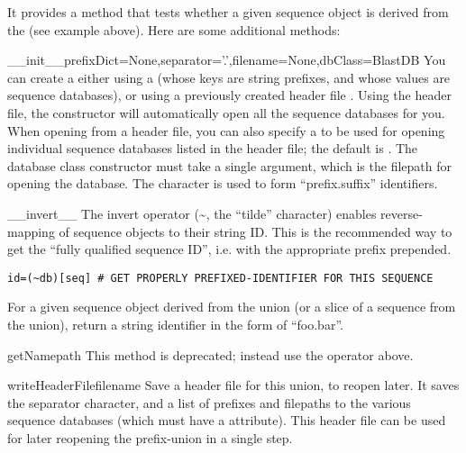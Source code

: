 \documentclass{howto}
\begin{document}
It provides a  method that tests whether
a given sequence object is derived from the 
(see example above).  Here are some additional methods:

\begin{funcdesc}{__init__}{prefixDict=None,separator='.',filename=None,dbClass=BlastDB}
  You can create a  either using
  a  (whose keys are string prefixes, and whose 
  values are sequence databases), or using a previously created
  header file .  
  Using the header file, the constructor will
  automatically open all the sequence databases for you.
  When opening from a header file, you can also specify a
   to be used for opening individual sequence databases
  listed in the header file; the default is .
  The database class constructor must take a single argument,
  which is the filepath for opening the database.  The 
   character is used to form ``prefix.suffix''
  identifiers.
\end{funcdesc}

\begin{funcdesc}{__invert__}{}
  The invert operator (\textasciitilde, the ``tilde'' character) 
  enables reverse-mapping of sequence objects to their string ID.
  This is the recommended way to get the ``fully qualified sequence ID'', i.e. with
  the appropriate prefix prepended. 
\begin{verbatim}
id=(~db)[seq] # GET PROPERLY PREFIXED-IDENTIFIER FOR THIS SEQUENCE
\end{verbatim}
  For a given sequence object  derived from the union
  (or a slice of a sequence from the union), return a string identifier
  in the form of ``foo.bar''.  
\end{funcdesc}

\begin{funcdesc}{getName}{path}
  This method is deprecated; instead use the  operator
  above.
\end{funcdesc}

\begin{funcdesc}{writeHeaderFile}{filename}
  Save a header file for this union, to reopen later.
  It saves the separator character, and a list of prefixes
  and filepaths to the various sequence databases (which
  must have a  attribute).  This header
  file can be used for later reopening the prefix-union
  in a single step.
\end{funcdesc}
\end{document}
